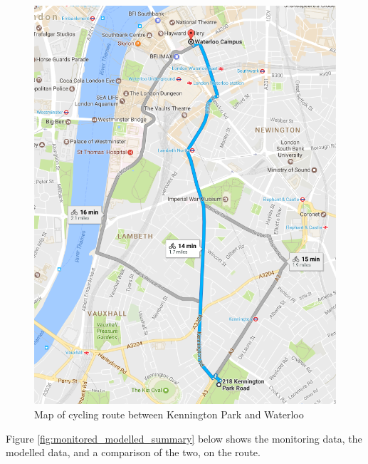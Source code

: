 \begin{figure}[H]
\centering
\includegraphics[scale=0.7]{images/cycling_journey.png}
\caption{Map of cycling route between Kennington Park and Waterloo}
\label{fig:cycling_journey}
\end{figure}

Figure \ref{fig:monitored_modelled_summary} below shows the monitoring data, the modelled data, and a comparison of the two, on the route.

